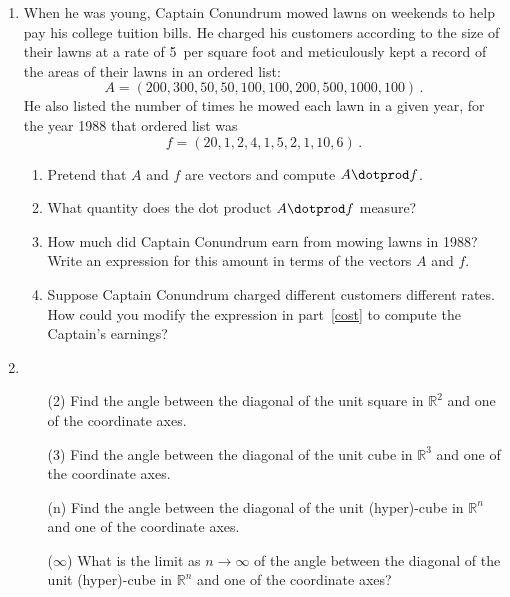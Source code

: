 

\begin{enumerate}

\item When he was young, Captain Conundrum mowed lawns on weekends to help pay his college tuition bills. He charged his customers according to the size of their lawns at a rate of 5\textcent \ per square foot and meticulously kept a record of the areas of their lawns in an ordered list:
\[
A=(200,300,50,50,100,100,200,500,1000,100)\, .
\]
He also listed the number of times he mowed each lawn in a given year, for the year 1988 that ordered list was
\[
f=(20,1,2,4,1,5,2,1,10,6)\, .
\]
\begin{enumerate}
\item
Pretend that $A$ and $f$ are vectors and compute $A\dotprod f$.
\item
What quantity does the dot product $A\dotprod f$ measure?
\item\label{cost}
How much did Captain Conundrum earn from mowing lawns in 1988? Write an expression
for this amount in terms of the vectors $A$ and $f$.
\item Suppose Captain Conundrum charged different customers different rates. How could
you modify the expression in part~\ref{cost} to compute the Captain's earnings?
\end{enumerate}


\item \begin{itemize}
	\item[(2)] Find the angle between the diagonal of the unit square in $\mathbb{R}^2$ and one of the coordinate axes.

	\item[(3)] Find the angle between the diagonal of the unit cube in $\mathbb{R}^3$ and one of the coordinate axes.

	\item[(n)] Find the angle between the diagonal of the unit (hyper)-cube in $\mathbb{R}^n$ and one of the coordinate axes.

	\item[($\infty$)] What is the limit as $n \to \infty$ of the angle between the diagonal of the unit (hyper)-cube in $\mathbb{R}^n$ and one of the coordinate axes?
\end{itemize}



\end{enumerate}
